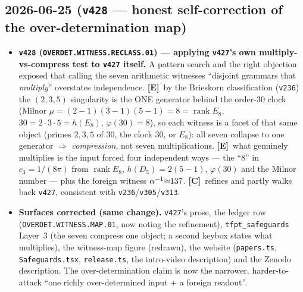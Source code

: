 \documentclass[11pt]{article}
\providecommand{\mE}{\textbf{[E]}}\providecommand{\mC}{\textbf{[C]}}
\providecommand{\vref}[1]{\texttt{#1}}
\providecommand{\cthree}{c_3}\providecommand{\phiz}{\varphi_0^{\mathrm{ret}}}
\begin{document}
\subsection*{2026-06-25 (\texttt{v428} --- honest self-correction of the over-determination map)}
\begin{itemize}
\item \textbf{\texttt{v428} (\texttt{OVERDET.WITNESS.RECLASS.01}) --- applying \texttt{v427}'s own
multiply-vs-compress test to \texttt{v427} itself.} A pattern search and the right objection exposed that
calling the seven arithmetic witnesses ``disjoint grammars that \emph{multiply}'' overstates independence.
\mE\ by the Brieskorn classification (\vref{v236}) the $(2,3,5)$ singularity is the ONE generator behind the
order-$30$ clock (Milnor $\mu{=}(2{-}1)(3{-}1)(5{-}1){=}8{=}\operatorname{rank}E_8$, $30{=}2{\cdot}3{\cdot}5
{=}h(E_8)$, $\varphi(30){=}8$), so each witness is a facet of that same object (primes $2,3,5$ of $30$, the
clock $30$, or $E_8$): all seven collapse to one generator $\Rightarrow$ \emph{compression}, not seven
multiplications. \mE\ what genuinely multiplies is the input forced four independent ways --- the ``$8$'' in
$\cthree{=}1/(8\pi)$ from $\operatorname{rank}E_8$, $h(D_5){=}2(5{-}1)$, $\varphi(30)$ and the Milnor number
--- plus the foreign witness $\alpha^{-1}{\approx}137$. \mC\ refines and partly walks back \texttt{v427},
consistent with \vref{v236}/\vref{v305}/\vref{v313}.
\item \textbf{Surfaces corrected (same change).} \texttt{v427}'s prose, the ledger row
(\texttt{OVERDET.WITNESS.MAP.01}, now noting the refinement), \texttt{tfpt\_safeguards} Layer~3 (the seven
compress one object; a second keybox states what multiplies), the witness-map figure (redrawn), the website
(\texttt{papers.ts}, \texttt{Safeguards.tsx}, \texttt{release.ts}, the intro-video description) and the
Zenodo description. The over-determination claim is now the narrower, harder-to-attack ``one richly
over-determined input $+$ a foreign readout''.
\end{itemize}
\end{document}
